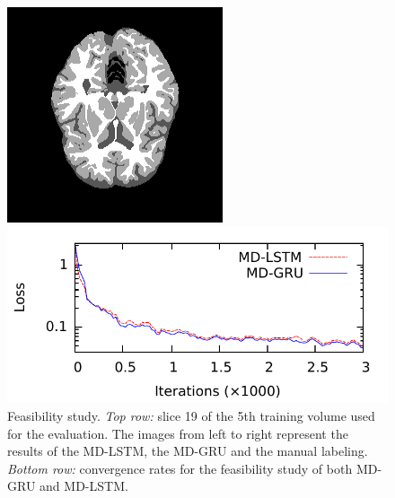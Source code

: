 \documentclass[runningheads,a4paper]{llncs}
\begin{document}
\begin{figure}
\begin{minipage}{.24\textwidth}
  \end{minipage}
  \begin{minipage}{.24\textwidth}
 \includegraphics[width=.98\linewidth]{./images/Traindata5atslice19-Testlabel.png}
  \end{minipage}
  
  \begin{minipage}{0.80\textwidth}
    \includegraphics[width=.9\linewidth]{./images/convergence_rate_new10000_mediumlines_withtitle6.pdf}
  \end{minipage}
  \caption{Feasibility study. \emph{Top row:} slice 19 of the 5th training volume used for the evaluation. The images from left to right represent the results of the MD-LSTM, the MD-GRU and the manual labeling. \emph{Bottom row:} convergence rates for the feasibility study of both MD-GRU and MD-LSTM.}
\label{feasibilityqualitative}

\end{figure}
\end{document}
